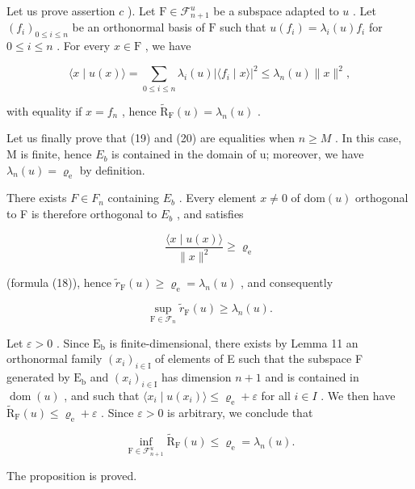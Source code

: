 Let us prove assertion \(c\) ). Let \(\mathrm{F} \in \mathcal{F}_{n+1}^{u}\) be a subspace adapted to \(u\) . Let \((f_{i})_{0 \leqslant i \leqslant n}\) be an orthonormal basis of \(\mathrm{F}\) such that \(u(f_{i}) = \lambda_{i}(u)f_{i}\) for \(0 \leqslant i \leqslant n\) . For every \(x \in \mathrm{F}\) , we have

\[
\langle x \mid u (x) \rangle = \sum_ {0 \leqslant i \leqslant n} \lambda_ {i} (u) | \langle f _ {i} \mid x \rangle | ^ {2} \leqslant \lambda_ {n} (u) \| x \| ^ {2},
\]

with equality if \(x = f_{n}\) , hence \(\widetilde{\mathrm{R}}_{\mathrm{F}}(u) = \lambda_{n}(u)\) .

Let us finally prove that (19) and (20) are equalities when \(n \geqslant M\) . In this case, M is finite, hence \(E_{b}\) is contained in the domain of u; moreover, we have \(\lambda_{n}(u) = \varrho_{\mathrm{e}}\) by definition.

There exists \(F \in F_{n}\) containing \(E_{b}\) . Every element \(x \neq 0\) of \(\text{dom}(u)\) orthogonal to F is therefore orthogonal to \(E_{b}\) , and satisfies

\[
\frac {\langle x \mid u (x) \rangle}{\| x \| ^ {2}} \geqslant \varrho_ {\mathrm{e}}
\]

(formula (18)), hence \(\widetilde{r}_{\mathrm{F}}(u) \geqslant \varrho_{\mathrm{e}} = \lambda_n(u)\) , and consequently

\[
\sup _ {\mathrm{F} \in \mathcal {F} _ {n}} \widetilde {r} _ {\mathrm{F}} (u) \geqslant \lambda_ {n} (u).
\]

Let \(\varepsilon > 0\) . Since \(\mathrm{E_b}\) is finite-dimensional, there exists by Lemma 11 an orthonormal family \((x_i)_{i \in \mathrm{I}}\) of elements of E such that the subspace F generated by \(\mathrm{E_b}\) and \((x_i)_{i \in \mathrm{I}}\) has dimension \(n + 1\) and is contained in \(\operatorname{dom}(u)\) , and such that \(\langle x_{i} \mid u(x_{i})\rangle \leqslant \varrho_{\mathrm{e}} + \varepsilon\) for all \(i \in I\) . We then have \(\widetilde{\mathrm{R}}_{\mathrm{F}}(u) \leqslant \varrho_{\mathrm{e}} + \varepsilon\) . Since \(\varepsilon > 0\) is arbitrary, we conclude that

\[
\inf _ {\mathrm{F} \in \mathcal {F} _ {n + 1} ^ {u}} \widetilde {\mathrm{R}} _ {\mathrm{F}} (u) \leqslant \varrho_ {\mathrm{e}} = \lambda_ {n} (u).
\]

The proposition is proved.

